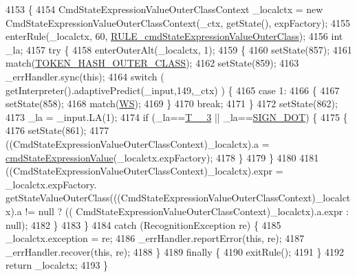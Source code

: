 \begin{DoxyCode}
4153                                                                                                            
                                               \{
4154     CmdStateExpressionValueOuterClassContext \_localctx = \textcolor{keyword}{new} CmdStateExpressionValueOuterClassContext(\_ctx,
       getState(), expFactory);
4155     enterRule(\_localctx, 60, \hyperlink{classgov_1_1nasa_1_1jpf_1_1inspector_1_1server_1_1expression_1_1parser_1_1_expression_grammar_parser_acfae7005ac7c8362224a52d7fe797cc4}{RULE\_cmdStateExpressionValueOuterClass});
4156     \textcolor{keywordtype}{int} \_la;
4157     \textcolor{keywordflow}{try} \{
4158       enterOuterAlt(\_localctx, 1);
4159       \{
4160       setState(857);
4161       match(\hyperlink{classgov_1_1nasa_1_1jpf_1_1inspector_1_1server_1_1expression_1_1parser_1_1_expression_grammar_parser_aefee9e9c56459dd1e9ef51310172faa1}{TOKEN\_HASH\_OUTER\_CLASS});
4162       setState(859);
4163       \_errHandler.sync(\textcolor{keyword}{this});
4164       \textcolor{keywordflow}{switch} ( getInterpreter().adaptivePredict(\_input,149,\_ctx) ) \{
4165       \textcolor{keywordflow}{case} 1:
4166         \{
4167         setState(858);
4168         match(\hyperlink{classgov_1_1nasa_1_1jpf_1_1inspector_1_1server_1_1expression_1_1parser_1_1_expression_grammar_parser_ace44714ae633c7b14794cc5a24d9ebf3}{WS});
4169         \}
4170         \textcolor{keywordflow}{break};
4171       \}
4172       setState(862);
4173       \_la = \_input.LA(1);
4174       \textcolor{keywordflow}{if} (\_la==\hyperlink{classgov_1_1nasa_1_1jpf_1_1inspector_1_1server_1_1expression_1_1parser_1_1_expression_grammar_parser_a68f9589dcc3fc777455467ff010385ea}{T\_\_3} || \_la==\hyperlink{classgov_1_1nasa_1_1jpf_1_1inspector_1_1server_1_1expression_1_1parser_1_1_expression_grammar_parser_af578d1cac8553bcf6f52608a4e9125f1}{SIGN\_DOT}) \{
4175         \{
4176         setState(861);
4177         ((CmdStateExpressionValueOuterClassContext)\_localctx).a = 
      \hyperlink{classgov_1_1nasa_1_1jpf_1_1inspector_1_1server_1_1expression_1_1parser_1_1_expression_grammar_parser_a9c38888905b31e514c2e4a695b8b2be6}{cmdStateExpressionValue}(\_localctx.expFactory);
4178         \}
4179       \}
4180 
4181        ((CmdStateExpressionValueOuterClassContext)\_localctx).expr =  \_localctx.expFactory.
      getStateValueOuterClass(((CmdStateExpressionValueOuterClassContext)\_localctx).a != null ? ((
      CmdStateExpressionValueOuterClassContext)\_localctx).a.expr : null); 
4182       \}
4183     \}
4184     \textcolor{keywordflow}{catch} (RecognitionException re) \{
4185       \_localctx.exception = re;
4186       \_errHandler.reportError(\textcolor{keyword}{this}, re);
4187       \_errHandler.recover(\textcolor{keyword}{this}, re);
4188     \}
4189     \textcolor{keywordflow}{finally} \{
4190       exitRule();
4191     \}
4192     \textcolor{keywordflow}{return} \_localctx;
4193   \}
\end{DoxyCode}
